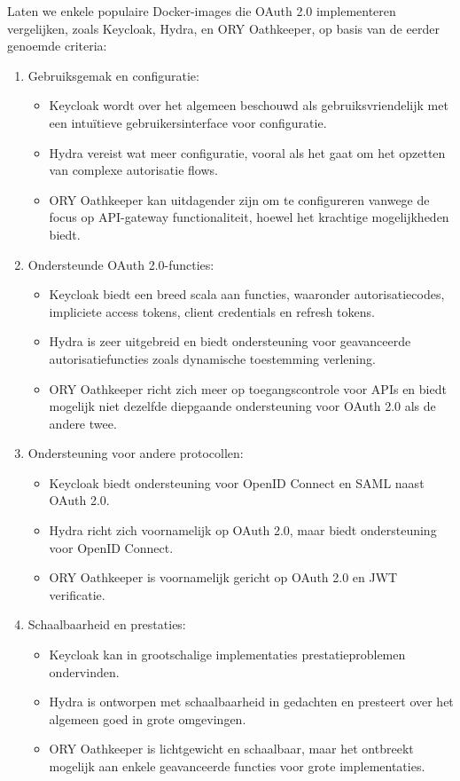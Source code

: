 Laten we enkele populaire Docker-images die OAuth 2.0 implementeren vergelijken, zoals Keycloak, Hydra, en ORY Oathkeeper, op basis van de eerder genoemde criteria:

\begin{enumerate}
  \item Gebruiksgemak en configuratie:
  \begin{itemize}
    \item Keycloak wordt over het algemeen beschouwd als gebruiksvriendelijk met een intuïtieve gebruikersinterface voor configuratie.
    \item Hydra vereist wat meer configuratie, vooral als het gaat om het opzetten van complexe autorisatie flows.
    \item ORY Oathkeeper kan uitdagender zijn om te configureren vanwege de focus op API-gateway functionaliteit, hoewel het krachtige mogelijkheden biedt.
  \end{itemize}
  
  \item Ondersteunde OAuth 2.0-functies:
  \begin{itemize}
    \item Keycloak biedt een breed scala aan functies, waaronder autorisatiecodes, impliciete access tokens, client credentials en refresh tokens.
    \item Hydra is zeer uitgebreid en biedt ondersteuning voor geavanceerde autorisatiefuncties zoals dynamische toestemming verlening.
    \item ORY Oathkeeper richt zich meer op toegangscontrole voor APIs en biedt mogelijk niet dezelfde diepgaande ondersteuning voor OAuth 2.0 als de andere twee.
  \end{itemize}
  
  \item Ondersteuning voor andere protocollen:
  \begin{itemize}
    \item Keycloak biedt ondersteuning voor OpenID Connect en SAML naast OAuth 2.0.
    \item Hydra richt zich voornamelijk op OAuth 2.0, maar biedt ondersteuning voor OpenID Connect.
    \item ORY Oathkeeper is voornamelijk gericht op OAuth 2.0 en JWT verificatie.
  \end{itemize}
  
  \item Schaalbaarheid en prestaties:
  \begin{itemize}
    \item Keycloak kan in grootschalige implementaties prestatieproblemen ondervinden.
    \item Hydra is ontworpen met schaalbaarheid in gedachten en presteert over het algemeen goed in grote omgevingen.
    \item ORY Oathkeeper is lichtgewicht en schaalbaar, maar het ontbreekt mogelijk aan enkele geavanceerde functies voor grote implementaties.
  \end{itemize}
  

\end{enumerate}
